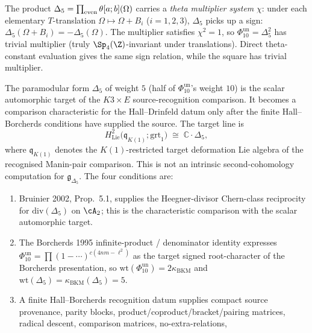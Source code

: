 \begin{remark}
\label{rem:delta5-multiplier}
The product $\Delta_5 = \prod_{\textup{even}} \theta[a;b](\Omega)$
carries a \emph{theta multiplier system} $\chi$: under each
elementary $T$-translation $\Omega \mapsto \Omega + B_i$
($i = 1, 2, 3$), $\Delta_5$ picks up a sign:
$\Delta_5(\Omega + B_i) = -\Delta_5(\Omega)$. The multiplier
satisfies $\chi^2 = 1$, so $\Phi_{10}^{\mathrm{un}} = \Delta_5^2$ has trivial
multiplier (truly $\Sp_4(\Z)$-invariant under translations).
Direct theta-constant evaluation gives the same sign relation, while
the square has trivial multiplier.
\end{remark}

\begin{remark}
\label{rem:brf-delta5-comparison-characteristic}
The paramodular form $\Delta_5$ of weight $5$ (half of
$\Phi_{10}^{\mathrm{un}}$'s weight $10$) is the scalar automorphic
target of the $K3\times E$ source-recognition comparison. It becomes a
comparison characteristic for the Hall--Drinfeld datum only after the
finite Hall--Borcherds conditions have supplied the source. The target line is
\[
 H^2_{\mathrm{Lie}}\bigl(\mathfrak q_{K(1)};\mathrm{grt}_1\bigr)
 \;\cong\; \mathbb{C} \cdot \Delta_5,
\]
where $\mathfrak q_{K(1)}$ denotes the $K(1)$-restricted target
deformation Lie algebra of the recognised Manin-pair comparison. This is
not an intrinsic second-cohomology computation for
$\mathfrak{g}_{\Delta_5}$. The four conditions are:
\begin{enumerate}[label=\textup{(\roman*)}]
 \item Bruinier 2002, Prop.~5.1, supplies the Heegner-divisor
 Chern-class reciprocity for $\mathrm{div}(\Delta_5)$ on $\cA_2$; this
 is the characteristic comparison with the scalar automorphic target.
 \item The Borcherds 1995 infinite-product / denominator identity expresses
 $\Phi_{10}^{\mathrm{un}} = \prod (1 - \cdots)^{c(4nm - \ell^2)}$ as the
 target signed root-character of the Borcherds presentation, so
 $\mathrm{wt}(\Phi_{10}^{\mathrm{un}}) = 2\kappa_{\mathrm{BKM}}$ and
 $\mathrm{wt}(\Delta_5) = \kappa_{\mathrm{BKM}}(\Delta_5) = 5$.
 \item A finite Hall--Borcherds recognition datum supplies compact
 source provenance, parity blocks, product/coproduct/bracket/pairing
 matrices, radical descent, comparison matrices, no-extra-relations,

\end{enumerate}
\end{remark}
